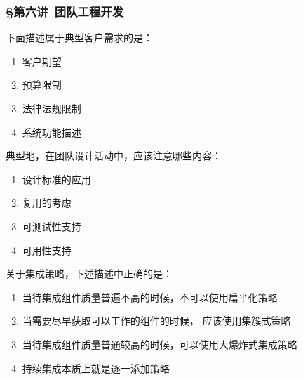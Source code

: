 \subsubsection*{\S 第六讲\ 团队工程开发}
\setcounter{problemname}{0}

\begin{problem}
	下面描述属于典型客户需求的是： 
    \vspace{-0.8em}
    \begin{multicols}{4}
        \begin{enumerate}[label=\Alph*.]
            \item 客户期望
            \item 预算限制
            \item 法律法规限制
            \item 系统功能描述
        \end{enumerate}
    \end{multicols}
    \vspace{-1em}
\end{problem}



\begin{problem}
	典型地，在团队设计活动中，应该注意哪些内容：
    \vspace{-0.8em}
    \begin{multicols}{4}
        \begin{enumerate}[label=\Alph*.]
            \item 设计标准的应用
            \item 复用的考虑
            \item 可测试性支持
            \item 可用性支持
        \end{enumerate}
    \end{multicols}
    \vspace{-1em}
\end{problem}




\begin{problem}
	关于集成策略，下述描述中正确的是： 
        \begin{enumerate}[label=\Alph*.]
            \item 当待集成组件质量普遍不高的时候，不可以使用扁平化策略
            \item 当需要尽早获取可以工作的组件的时候， 应该使用集簇式策略
            \item 当待集成组件质量普通较高的时候，可以使用大爆炸式集成策略
            \item 持续集成本质上就是逐一添加策略
        \end{enumerate}
\end{problem}




